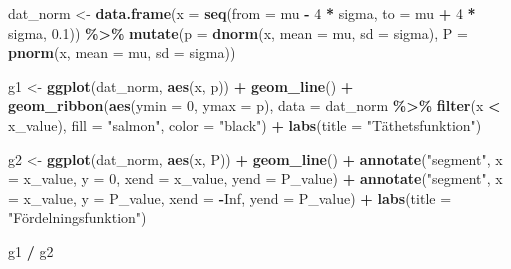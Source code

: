 \documentclass[
]{book}
\newenvironment{Shaded}{\begin{snugshade}}{\end{snugshade}}
\newcommand{\AttributeTok}[1]{\textcolor[rgb]{0.13,0.29,0.53}{#1}}
\newcommand{\ConstantTok}[1]{\textcolor[rgb]{0.56,0.35,0.01}{#1}}
\newcommand{\DecValTok}[1]{\textcolor[rgb]{0.00,0.00,0.81}{#1}}
\newcommand{\FloatTok}[1]{\textcolor[rgb]{0.00,0.00,0.81}{#1}}
\newcommand{\FunctionTok}[1]{\textcolor[rgb]{0.13,0.29,0.53}{\textbf{#1}}}
\newcommand{\NormalTok}[1]{#1}
\newcommand{\OtherTok}[1]{\textcolor[rgb]{0.56,0.35,0.01}{#1}}
\newcommand{\SpecialCharTok}[1]{\textcolor[rgb]{0.81,0.36,0.00}{\textbf{#1}}}
\newcommand{\StringTok}[1]{\textcolor[rgb]{0.31,0.60,0.02}{#1}}
\theoremstyle{definition}
\theoremstyle{definition}
\theoremstyle{definition}
\theoremstyle{definition}
\theoremstyle{remark}
\begin{document}
\begin{Shaded}
\begin{Highlighting}[]
\NormalTok{dat\_norm }\OtherTok{\textless{}{-}} \FunctionTok{data.frame}\NormalTok{(}\AttributeTok{x =} \FunctionTok{seq}\NormalTok{(}\AttributeTok{from =}\NormalTok{ mu }\SpecialCharTok{{-}} \DecValTok{4} \SpecialCharTok{*}\NormalTok{ sigma, }\AttributeTok{to =}\NormalTok{ mu }\SpecialCharTok{+} \DecValTok{4} \SpecialCharTok{*}\NormalTok{ sigma, }\FloatTok{0.1}\NormalTok{)) }\SpecialCharTok{\%\textgreater{}\%} 
  \FunctionTok{mutate}\NormalTok{(}\AttributeTok{p =} \FunctionTok{dnorm}\NormalTok{(x, }\AttributeTok{mean =}\NormalTok{ mu, }\AttributeTok{sd =}\NormalTok{ sigma),}
         \AttributeTok{P =} \FunctionTok{pnorm}\NormalTok{(x, }\AttributeTok{mean =}\NormalTok{ mu, }\AttributeTok{sd =}\NormalTok{ sigma))}

\NormalTok{g1 }\OtherTok{\textless{}{-}} \FunctionTok{ggplot}\NormalTok{(dat\_norm, }\FunctionTok{aes}\NormalTok{(x, p)) }\SpecialCharTok{+}
  \FunctionTok{geom\_line}\NormalTok{() }\SpecialCharTok{+}
  \FunctionTok{geom\_ribbon}\NormalTok{(}\FunctionTok{aes}\NormalTok{(}\AttributeTok{ymin =} \DecValTok{0}\NormalTok{, }\AttributeTok{ymax =}\NormalTok{ p), }\AttributeTok{data =}\NormalTok{ dat\_norm }\SpecialCharTok{\%\textgreater{}\%} \FunctionTok{filter}\NormalTok{(x }\SpecialCharTok{\textless{}}\NormalTok{ x\_value), }\AttributeTok{fill =} \StringTok{"salmon"}\NormalTok{, }\AttributeTok{color =} \StringTok{"black"}\NormalTok{) }\SpecialCharTok{+}
  \FunctionTok{labs}\NormalTok{(}\AttributeTok{title =} \StringTok{"Täthetsfunktion"}\NormalTok{)}

\NormalTok{g2 }\OtherTok{\textless{}{-}} \FunctionTok{ggplot}\NormalTok{(dat\_norm, }\FunctionTok{aes}\NormalTok{(x, P)) }\SpecialCharTok{+}
  \FunctionTok{geom\_line}\NormalTok{() }\SpecialCharTok{+}
  \FunctionTok{annotate}\NormalTok{(}\StringTok{"segment"}\NormalTok{, }\AttributeTok{x =}\NormalTok{ x\_value, }\AttributeTok{y =} \DecValTok{0}\NormalTok{, }\AttributeTok{xend =}\NormalTok{ x\_value, }\AttributeTok{yend =}\NormalTok{ P\_value) }\SpecialCharTok{+}
  \FunctionTok{annotate}\NormalTok{(}\StringTok{"segment"}\NormalTok{, }\AttributeTok{x =}\NormalTok{ x\_value, }\AttributeTok{y =}\NormalTok{ P\_value, }\AttributeTok{xend =} \SpecialCharTok{{-}}\ConstantTok{Inf}\NormalTok{, }\AttributeTok{yend =}\NormalTok{ P\_value) }\SpecialCharTok{+}
  \FunctionTok{labs}\NormalTok{(}\AttributeTok{title =} \StringTok{"Fördelningsfunktion"}\NormalTok{)}

\NormalTok{g1 }\SpecialCharTok{/}\NormalTok{ g2}
\end{Highlighting}
\end{Shaded}
\end{document}
